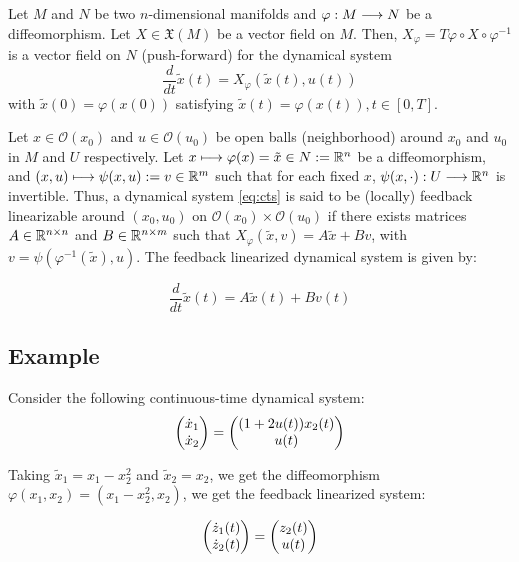 \begin{defn}
    Let $M$ and $N$ be two $n$-dimensional manifolds and $\varphi: M \lra N$ be a diffeomorphism. Let $X \in \mathfrak{X}(M)$ be a vector field on $M$. Then, $X_{\varphi} = T\varphi \circ X \circ \varphi^{-1}$ is a vector field on $N$ (push-forward) for the dynamical system
    \begin{equation}
        \dfrac{d}{dt}\tilde{x}(t) = X_{\varphi}(\tilde{x}(t), u(t))
    \end{equation}
    with $\tilde{x}(0) = \varphi(x(0))$ satisfying $\tilde{x}(t) = \varphi(x(t)), t \in [0,T]$.

    Let $x \in \mathcal{O}(x_0)$ and $u \in \mathcal{O}(u_0)$ be open balls (neighborhood) around $x_0$ and $u_0$ in $M$ and $U$ respectively. Let $x \mapsto \varphi(x) = \tilde{x} \in N : = \R[n]$ be a diffeomorphism, and $(x,u) \mapsto \psi(x,u) : = v \in \R[m]$ such that for each fixed $x$, $\psi(x, \cdot) : U \lra \R[n]$ is invertible. Thus, a dynamical system \eqref{eq:cts} is said to be (locally) feedback linearizable around $(x_0, u_0)$ on $\mathcal{O}(x_0) \times \mathcal{O}(u_0)$ if there exists matrices $A \in \R[n \times n]$ and $B \in \R[n \times m]$ such that $X_{\varphi}(\tilde{x}, v) = A \tilde{x} + Bv$, with $v = \psi(\varphi^{-1}(\tilde{x}), u)$. The feedback linearized dynamical system is given by:

    \begin{equation}
        \dfrac{d}{dt}\tilde{x}(t) = A \tilde{x}(t) + B v(t)
    \end{equation}
\end{defn}

\subsection{Example}

Consider the following continuous-time dynamical system:
    \begin{equation}
        \pmat{\dot{x}_1 \\ \dot{x}_2} = \pmat{(1+2u(t))x_2(t) \\ u(t)}
    \end{equation}

Taking $\tilde{x}_1 = x_1 - x_2^2$ and $\tilde{x}_2 = x_2$, we get the diffeomorphism $\varphi(x_1, x_2) = \left(x_1 - x_2^2, x_2 \right)$, we get the feedback linearized system:

\begin{equation}
    \pmat{\dot{z}_1(t) \\ \dot{z}_2(t)} = \pmat{z_2(t) \\ u(t)}
\end{equation}

